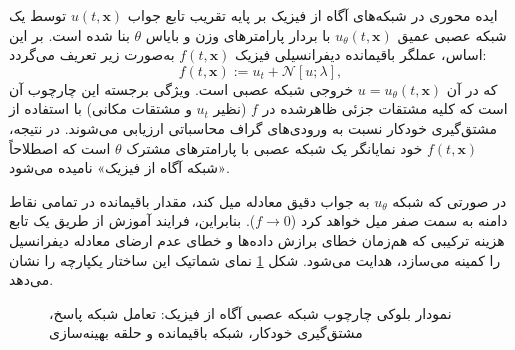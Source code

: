 ایده محوری در شبکه‌های آگاه از فیزیک بر پایه تقریب تابع جواب $u(t,\mathbf{x})$ توسط یک شبکه عصبی عمیق $u_\theta(t,\mathbf{x})$ با بردار پارامترهای وزن و بایاس $\theta$ بنا شده است. بر این اساس، عملگر باقیمانده دیفرانسیلی فیزیک $f(t,\mathbf{x})$ به‌صورت زیر تعریف می‌گردد:
\begin{equation}
f(t,\mathbf{x}) := u_t + \mathcal{N}[u; \lambda],
\label{eq:residual}
\end{equation}
که در آن $u = u_\theta(t,\mathbf{x})$ خروجی شبکه عصبی است. ویژگی برجسته این چارچوب آن است که کلیه مشتقات جزئی ظاهرشده در $f$ (نظیر $u_t$ و مشتقات مکانی) با استفاده از مشتق‌گیری خودکار نسبت به ورودی‌های گراف محاسباتی ارزیابی می‌شوند. در نتیجه، $f(t,\mathbf{x})$ خود نمایانگر یک شبکه عصبی با پارامترهای مشترک $\theta$ است که اصطلاحاً «شبکه آگاه از فیزیک» نامیده می‌شود.

در صورتی که شبکه $u_\theta$ به جواب دقیق معادله میل کند، مقدار باقیمانده در تمامی نقاط دامنه به سمت صفر میل خواهد کرد ($f \to 0$). بنابراین، فرایند آموزش از طریق یک تابع هزینه ترکیبی که هم‌زمان خطای برازش داده‌ها و خطای عدم ارضای معادله دیفرانسیل را کمینه می‌سازد، هدایت می‌شود. شکل \ref{fig:pinn} نمای شماتیک این ساختار یکپارچه را نشان می‌دهد.

\begin{figure}[t]
\centering
\begin{latin}
\end{latin}
\caption{نمودار بلوکی چارچوب شبکه عصبی آگاه از فیزیک: تعامل شبکه پاسخ، مشتق‌گیری خودکار، شبکه باقیمانده و حلقه بهینه‌سازی}
\label{fig:pinn}
\end{figure}

